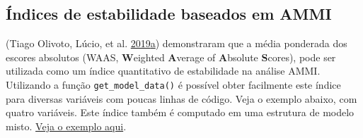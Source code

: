 \documentclass[
]{book}
\numberwithin{equation}{section}
\begin{document}
\hypertarget{uxedndices-de-estabilidade-baseados-em-ammi}{%
\subsection{Índices de estabilidade baseados em AMMI}\label{uxedndices-de-estabilidade-baseados-em-ammi}}

(Tiago Olivoto, Lúcio, et al. \protect\hyperlink{ref-Olivoto2019}{2019}\protect\hyperlink{ref-Olivoto2019}{a}) demonstraram que a média ponderada dos escores absolutos (WAAS, \textbf{W}eighted \textbf{A}verage of \textbf{A}bsolute \textbf{S}cores), pode ser utilizada como um índice quantitativo de estabilidade na análise AMMI. Utilizando a função \texttt{get\_model\_data()} é possível obter facilmente este índice para diversas variáveis com poucas linhas de código. Veja o exemplo abaixo, com quatro variáveis. Este índice também é computado em uma estrutura de modelo misto. \protect\hyperlink{wsb}{Veja o exemplo aqui}.
\end{document}
